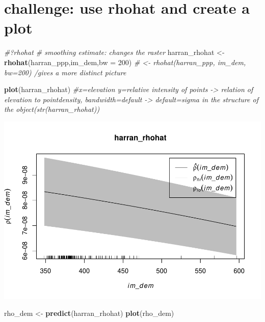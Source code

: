 \documentclass[]{article}
\newenvironment{Shaded}{\begin{snugshade}}{\end{snugshade}}
\newcommand{\KeywordTok}[1]{\textcolor[rgb]{0.13,0.29,0.53}{\textbf{{#1}}}}
\newcommand{\DataTypeTok}[1]{\textcolor[rgb]{0.13,0.29,0.53}{{#1}}}
\newcommand{\DecValTok}[1]{\textcolor[rgb]{0.00,0.00,0.81}{{#1}}}
\newcommand{\StringTok}[1]{\textcolor[rgb]{0.31,0.60,0.02}{{#1}}}
\newcommand{\CommentTok}[1]{\textcolor[rgb]{0.56,0.35,0.01}{\textit{{#1}}}}
\newcommand{\NormalTok}[1]{{#1}}
\begin{document}
\section{challenge: use rhohat and create a
plot}\label{challenge-use-rhohat-and-create-a-plot}

\begin{Shaded}
\begin{Highlighting}[]
\CommentTok{#?rhohat # smoothing estimate: changes the raster}
\NormalTok{harran_rhohat <-}\StringTok{ }\KeywordTok{rhohat}\NormalTok{(harran_ppp,im_dem,}\DataTypeTok{bw =} \DecValTok{200}\NormalTok{)}
              \CommentTok{# <- rhohat(harran_ppp, im_dem, bw=200) /gives a more distinct picture}

\KeywordTok{plot}\NormalTok{(harran_rhohat) }\CommentTok{#x=elevation y=relative intensity of points -> relation of elevation to pointdensity, bandwidth=default -> default=sigma in the structure of the object(str(harran_rhohat))}
\end{Highlighting}
\end{Shaded}

\includegraphics{HarranPlain_files/figure-latex/unnamed-chunk-7-1.pdf}

\begin{Shaded}
\begin{Highlighting}[]
\NormalTok{rho_dem <-}\StringTok{ }\KeywordTok{predict}\NormalTok{(harran_rhohat)}
\KeywordTok{plot}\NormalTok{(rho_dem)}
\end{Highlighting}
\end{Shaded}
\end{document}
